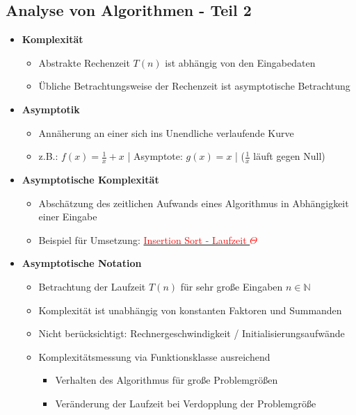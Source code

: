 \subsection{Analyse von Algorithmen - Teil 2}
    \begin{itemize}
        \item \textbf{Komplexität}
            \begin{itemize}
                \item Abstrakte Rechenzeit $T(n)$ ist abhängig von den Eingabedaten
                \item Übliche Betrachtungsweise der Rechenzeit ist asymptotische Betrachtung
            \end{itemize}
        
        \item \textbf{Asymptotik}
            \begin{itemize}
                \item Annäherung an einer sich ins Unendliche verlaufende Kurve
                \item z.B.: $f(x) = \frac{1}{x} + x$ | Asymptote: $g(x)=x$ | ($\frac{1}{x}$ läuft gegen Null)
            \end{itemize}
        
        \item \textbf{Asymptotische Komplexität}
            \begin{itemize}
                \item Abschätzung des zeitlichen Aufwands eines Algorithmus in Abhängigkeit einer Eingabe
                \item Beispiel für Umsetzung: \hyperref[insSortLaufzeitTheta]{\textcolor{red}{Insertion Sort - Laufzeit $\Theta$}}
            \end{itemize}

        \item \textbf{Asymptotische Notation}
            \begin{itemize}
                \item Betrachtung der Laufzeit $T(n)$ für sehr gro\ss e Eingaben $n \in \mathbb{N}$
                \item Komplexität ist unabhängig von konstanten Faktoren und Summanden
                \item Nicht berücksichtigt: Rechnergeschwindigkeit / Initialisierungsaufwände
                \item Komplexitätsmessung via Funktionsklasse ausreichend
                    \begin{itemize}
                        \item Verhalten des Algorithmus für gro\ss e Problemgrö\ss en
                        \item Veränderung der Laufzeit bei Verdopplung der Problemgrö\ss e
                    \end{itemize}
            \end{itemize}
        

\end{itemize}
